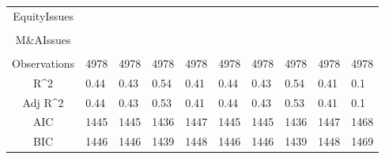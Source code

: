 \documentclass{article}
\begin{document}
\begin{table}[H]
\begin{tabular}{|clllllllll|}
  EquityIssues &  &  &  &  &  &  &  &  &  \\ 
   &  &  &  &  &  &  &  &  &  \\ 
  M\&AIssues &  &  &  &  &  &  &  &  &  \\ 
   &  &  &  &  &  &  &  &  &  \\ 
  \hline 
 Observations & 4978 & 4978 & 4978 & 4978 & 4978 & 4978 & 4978 & 4978 & 4978 \\ 
  R^2 & 0.44 & 0.43 & 0.54 & 0.41 & 0.44 & 0.43 & 0.54 & 0.41 & 0.1 \\ 
  Adj R^2 & 0.44 & 0.43 & 0.53 & 0.41 & 0.44 & 0.43 & 0.53 & 0.41 & 0.1 \\ 
  AIC & 1445 & 1445 & 1436 & 1447 & 1445 & 1445 & 1436 & 1447 & 1468 \\ 
  BIC & 1446 & 1446 & 1439 & 1448 & 1446 & 1446 & 1439 & 1448 & 1469 \\ 
   \hline
\end{tabular}
 
\end{table}
\end{document}
